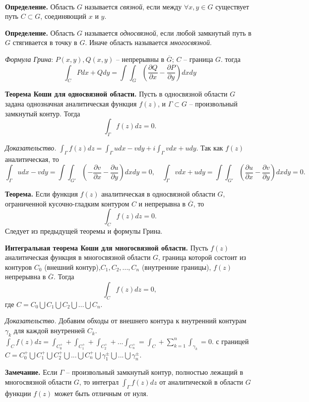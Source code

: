 \documentclass[9pt]{article}
\begin{document}
\ 
\par\textbf{Определение.} Область \(G\) называется \textit{связной}, если между \(\forall x,y\in G\) существует путь \(C\subset G\), соединяющий \(x\) и \(y\).
\par\textbf{Определение.} Область \(G\) называется \textit{односвязной}, если любой замкнутый путь в \(G\) стягивается в точку в \(G\). Иначе область называется \textit{многосвязной}.
\par\textit{Формула Грина}: \(P(x,y), Q(x,y)\) -- непрерывны в \(\overline{G}\); \(C\) -- граница \(G\). тогда
\begin{equation}
    \int_CPdx+Qdy=\int\int_G(\dfrac{\partial Q}{\partial x}-\dfrac{\partial P}{\partial y})dxdy
\end{equation}
\par\textbf{Теорема Коши для односвязной области.} Пусть в односвязной области \(G\) задана однозначная аналитическая функция \(f(z)\), и \(\Gamma\subset G\) -- произвольный замкнутый контур. Тогда
\[\int_\Gamma f(z)dz=0.\]
\par\textit{Доказательство.} \(\int_\Gamma f(z)dz=\int_\Gamma udx-vdy+i\int_\Gamma vdx+udy\). Так как \(f(z)\) аналитическая, то
\[\int_\Gamma udx-vdy=\int\int_{G'}(-\dfrac{\partial v}{\partial x}-\dfrac{\partial u}{\partial y})dxdy=0,\quad \int_\Gamma vdx+udy=\int\int_{G'}(\dfrac{\partial u}{\partial x}-\dfrac{\partial v}{\partial y})dxdy=0.\]
\par\textbf{Теорема.} Если функция \(f(z)\) аналитическая в односвязной области \(G\), ограниченной кусочно-гладким контуром \(C\) и непрерывна в \(\overline{G}\), то
\[\int_Cf(z)dz=0.\]
Следует из предыдущей теоремы и формулы Грина.
\par\textbf{Интегральная теорема Коши для многосвязной области.} Пусть \(f(z)\) аналитическая функция в многосвязной области \(G\), граница которой состоит из контуров \(C_0\) (внешний контур),\(C_1,C_2,...,C_n\) (внутренние границы), \(f(z)\) непрерывна в \(\overline{G}\). Тогда 
\[\int_Cf(z)dz=0,\]
где \(C=C_0\bigcup C_1\bigcup C_2\bigcup...\bigcup C_n\).
\par\textit{Доказательство.} Добавим обходы от внешнего контура к внутренний контурам \(\gamma_k\) для каждой внутренней \(C_k\). \(\int_Cf(z)dz=\int_{C_0^+}+\int_{C_1^+}+\int_{C_2^+}+...\int_{C_n^+}=\int_C+\displaystyle\sum_{k=1}^n\int_{\gamma_k}=0\).
\parОбласть с границей \(C = C_0^+\bigcup C_1^+\bigcup C_2^+\bigcup ... \bigcup C_n^+\bigcup\gamma_1^\pm\bigcup...\bigcup\gamma_n^\pm\).
\par\textbf{Замечание.} Если \(\Gamma\) -- произвольный замкнутый контур, полностью лежащий в многосвязной области \(G\), то интеграл \(\int_\Gamma f(z)dz\) от аналитической в области \(G\) функции \(f(z)\) может быть отличным от нуля.
\end{document}
